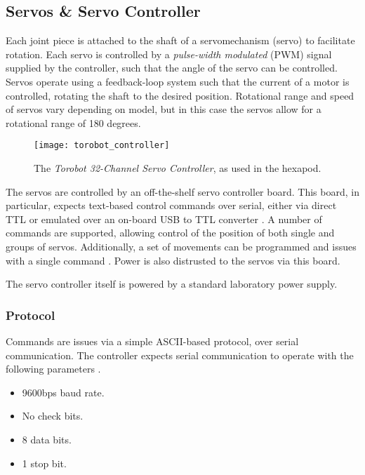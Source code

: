 \subsection{Servos \& Servo Controller}
Each joint piece is attached to the shaft of a servomechanism (servo) to facilitate rotation. Each servo is controlled by a \emph{pulse-width modulated} (PWM) signal supplied by the controller, such that the angle of the servo can be controlled. Servos operate using a feedback-loop system such that the current of a motor is controlled, rotating the shaft to the desired position. Rotational range and speed of servos vary depending on model, but in this case the servos allow for a rotational range of 180 degrees.

\begin{figure}[!h]
    \centering
    \texttt{[image: torobot\_controller]}
    \caption{The \emph{Torobot 32-Channel Servo Controller}, as used in the hexapod.}
    \label{fig:torobot_controller}
\end{figure}

The servos are controlled by an off-the-shelf servo controller board. This board, in particular, expects text-based control commands over serial, either via direct TTL or emulated over an on-board USB to TTL converter \cite{torobot_manual}. A number of commands are supported, allowing control of the position of both single and groups of servos. Additionally, a set of movements can be programmed and issues with a single command \cite{torobot_manual}. Power is also distrusted to the servos via this board.

The servo controller itself is powered by a standard laboratory power supply.

\subsubsection{Protocol}

Commands are issues via a simple ASCII-based protocol, over serial communication. The controller expects serial communication to operate with the following parameters \cite{torobot_manual}.

\begin{itemize}
    \item 9600bps baud rate.
    \item No check bits.
    \item 8 data bits.
    \item 1 stop bit.
\end{itemize}

